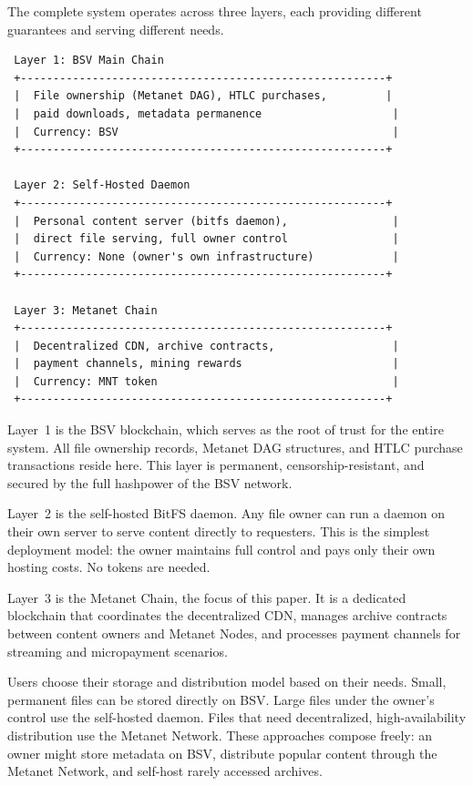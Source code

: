 \documentclass[11pt,a4paper]{article}
\begin{document}
The complete system operates across three layers, each providing different guarantees and serving different needs.

\begin{lstlisting}
 Layer 1: BSV Main Chain
 +--------------------------------------------------------+
 |  File ownership (Metanet DAG), HTLC purchases,         |
 |  paid downloads, metadata permanence                    |
 |  Currency: BSV                                          |
 +--------------------------------------------------------+

 Layer 2: Self-Hosted Daemon
 +--------------------------------------------------------+
 |  Personal content server (bitfs daemon),                |
 |  direct file serving, full owner control                |
 |  Currency: None (owner's own infrastructure)            |
 +--------------------------------------------------------+

 Layer 3: Metanet Chain
 +--------------------------------------------------------+
 |  Decentralized CDN, archive contracts,                  |
 |  payment channels, mining rewards                       |
 |  Currency: MNT token                                    |
 +--------------------------------------------------------+
\end{lstlisting}

Layer~1 is the BSV blockchain, which serves as the root of trust for the entire system. All file ownership records, Metanet DAG structures, and HTLC purchase transactions reside here. This layer is permanent, censorship-resistant, and secured by the full hashpower of the BSV network.

Layer~2 is the self-hosted BitFS daemon. Any file owner can run a daemon on their own server to serve content directly to requesters. This is the simplest deployment model: the owner maintains full control and pays only their own hosting costs. No tokens are needed.

Layer~3 is the Metanet Chain, the focus of this paper. It is a dedicated blockchain that coordinates the decentralized CDN, manages archive contracts between content owners and Metanet Nodes, and processes payment channels for streaming and micropayment scenarios.

Users choose their storage and distribution model based on their needs. Small, permanent files can be stored directly on BSV. Large files under the owner's control use the self-hosted daemon. Files that need decentralized, high-availability distribution use the Metanet Network. These approaches compose freely: an owner might store metadata on BSV, distribute popular content through the Metanet Network, and self-host rarely accessed archives.
\end{document}
